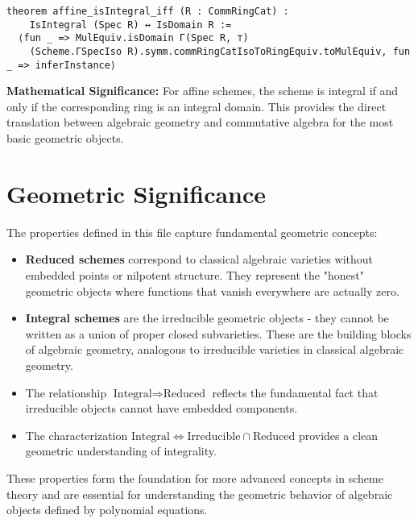 \documentclass{article}
\theoremstyle{definition}
\begin{document}
\begin{lstlisting}
theorem affine_isIntegral_iff (R : CommRingCat) :
    IsIntegral (Spec R) ↔ IsDomain R :=
  ⟨fun _ => MulEquiv.isDomain Γ(Spec R, ⊤)
    (Scheme.ΓSpecIso R).symm.commRingCatIsoToRingEquiv.toMulEquiv, fun _ => inferInstance⟩
\end{lstlisting}

\textbf{Mathematical Significance:} For affine schemes, the scheme is integral if and only if the corresponding ring is an integral domain. This provides the direct translation between algebraic geometry and commutative algebra for the most basic geometric objects.

\section{Geometric Significance}

The properties defined in this file capture fundamental geometric concepts:

\begin{itemize}
\item \textbf{Reduced schemes} correspond to classical algebraic varieties without embedded points or nilpotent structure. They represent the "honest" geometric objects where functions that vanish everywhere are actually zero.

\item \textbf{Integral schemes} are the irreducible geometric objects - they cannot be written as a union of proper closed subvarieties. These are the building blocks of algebraic geometry, analogous to irreducible varieties in classical algebraic geometry.

\item The relationship $\text{Integral} \Rightarrow \text{Reduced}$ reflects the fundamental fact that irreducible objects cannot have embedded components.

\item The characterization $\text{Integral} \Leftrightarrow \text{Irreducible} \cap \text{Reduced}$ provides a clean geometric understanding of integrality.
\end{itemize}

These properties form the foundation for more advanced concepts in scheme theory and are essential for understanding the geometric behavior of algebraic objects defined by polynomial equations.
\end{document}
